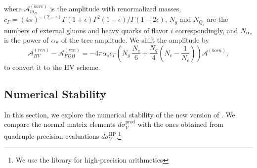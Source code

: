 where $\mathcal{A}^{(bare)}_{m_R}$ is the amplitude with renormalized masses,
$\displaystyle c_\Gamma={(4\pi)^{-(2-\epsilon)}{\Gamma(1+\epsilon)\Gamma^2(1-\epsilon)}/\Gamma(1-2\epsilon)}$,
$N_g$ and $N_{Q_i}$ are the numbers of external gluons and heavy quarks of flavor $i$ correspondingly,
and $N_{\alpha_s}$ is the power of $\alpha_s$ of the tree amplitude.
We shift \cite{Signer:2008va} the amplitude by
\begin{equation}
  \mathcal{A}^{(ren)}_{HV} - \mathcal{A}^{(ren)}_{FDH} = -4\pi \alpha_s c_\Gamma\left(N_{g}~\frac{N_c}{6} + \frac{N_q}{4}\left(N_c -\frac{1}{N_c}\right)\right)\mathcal{A}^{(born)},
  \label{schemeshift}
\end{equation}
to convert it to the HV scheme.


\subsection{Numerical Stability}
%
In this section, we explore the numerical stability of the new version of \BlackHat{}.
We compare the normal matrix elements $d\sigma_V^\mathrm{prod}$ with the ones obtained from quadruple-precision evaluations $d\sigma_V^\mathrm{HP}$.\footnote{
  We use the \cite{QD} library for high-precision arithmetics
}

